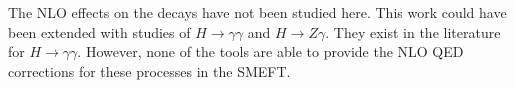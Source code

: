 The NLO effects on the decays have not been studied here. This work could have been extended with studies of $H\to \gamma\gamma$ and $ H\to Z\gamma$. They exist in the literature~\cite{Dawson:2018liq,Dedes:2018seb} for $H\to \gamma\gamma$. However, none of the tools are able to provide the NLO QED corrections for these processes in the SMEFT.



~\newline~

\let\Herwig\undefined
\let\Pythia\undefined
\let\Sherpa\undefined
\let\Rivet\undefined
\let\Professor\undefined
\let\eps\undefined
\let\mc\undefined
\let\mr\undefined
\let\mb\undefined
\let\tm\undefined




